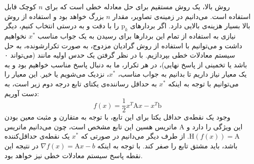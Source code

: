 روش بالا، یک روش مستقیم برای حل معادله خطی است که برای $n$ کوچک قابل استفاده است. می‌دانیم در زمینه‌ی تصاویر، مقدار $n$ بزرگ خواهد بود و استفاده از روش بالا بسیار هزینه‌ی بالایی دارد. اگر بردار‌های $\textrm{p}_k$ را با دقت و به درستی انتخاب کنیم، دیگر نیازی به استفاده از تمام این بردارها برای رسیدن به یک جواب مناسب $x^*$ نخواهیم داشت و می‌توانیم با استفاده از روش گرادیان مزدوج، به صورت تکرارشونده، به حل سیستم معادلات خطی بپردازیم. با در نظر گرفتن یک حدس اولیه مانند  (می‌تواند ۰ باشد یا تخمینی از پاسخ نهایی)، در هر تکرار، ما به دنبال پاسخ مناسب خواهیم بود و به یک معیار نیاز داریم تا بدانیم به جواب مناسب، $x^*$، نزدیک می‌شویم یا خیر. این معیار را می‌توانیم با توجه به اینکه $x^*$ به حداقل رساننده‌ی یکتای تابع درجه دوم زیر است، به دست آوریم:
\begin{equation}
	f(x) = \frac{1}{2}x^T\textrm{A}x - x^T\textrm{b}
\end{equation}
وجود یک نقطه‌ی حداقل یکتا برای این تابع، با توجه به متقارن و مثبت معین بودن ماتریس هسین این تابع مشخص است، چون می‌دانیم ماتریس A این ویژگی را دارد و $\textrm{H}(f(x)) = \textrm{A}$. از طرف دیگر می‌دانیم در صورتی که $x^*$ یک نقطه‌ی حداقل‌کننده باشد، باید مشتق تابع را صفر کند. با توجه به اینکه 
$\nabla f(x) = \textrm{A}x - b$ 
در نتیجه این نقطه پاسخ سیستم معادلات خطی نیز خواهد بود.

